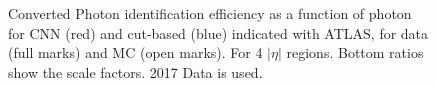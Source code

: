 \begin{figure}[htbp]
	\begin{tcolorbox}[colback=black!5!white,colframe=white!75!black]
    \caption{Converted Photon identification efficiency as a function of photon \eT for CNN (red) and cut-based (blue) indicated with ATLAS, for data (full marks) and MC (open marks). For 4 $|\eta|$ regions. Bottom ratios show the scale factors. 2017 Data is used.}
    \label{fig:gamma:CNN:Zllg:Energy:C}
    \end{tcolorbox}
\end{figure}

